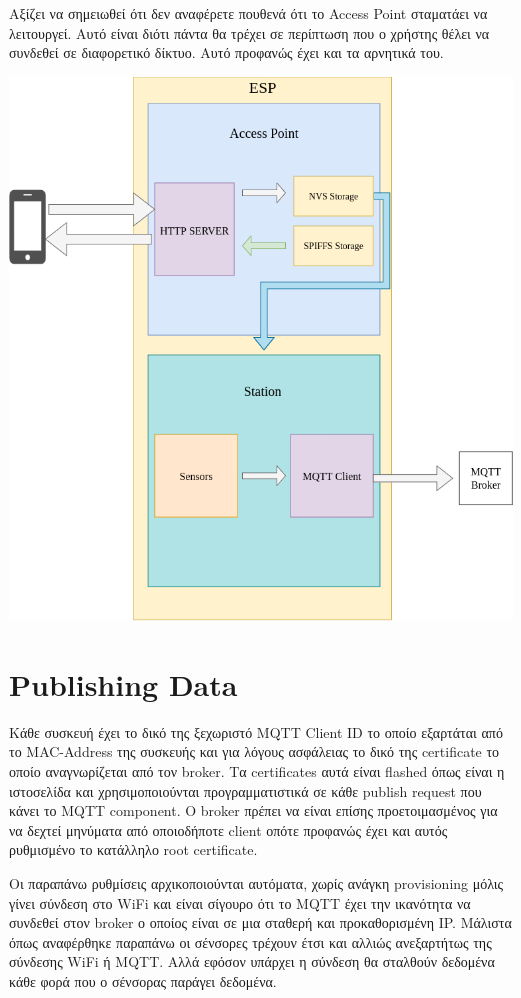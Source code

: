 \documentclass[a4paper,12pt]{article}
\begin{document}
Αξίζει να σημειωθεί ότι δεν αναφέρετε πουθενά ότι το Access Point σταματάει να λειτουργεί. Αυτό είναι διότι πάντα θα τρέχει σε περίπτωση που
ο χρήστης θέλει να συνδεθεί σε διαφορετικό δίκτυο. Αυτό προφανώς έχει και τα αρνητικά του.

\vspace{10mm}

\includegraphics[scale=0.5]{components.png}

\section{Publishing Data}

Κάθε συσκευή έχει το δικό της ξεχωριστό MQTT Client ID το οποίο εξαρτάται από το MAC-Address της συσκευής και για λόγους ασφάλειας
το δικό της certificate το οποίο αναγνωρίζεται από τον broker. Τα certificates αυτά είναι flashed όπως είναι η ιστοσελίδα και χρησιμοποιούνται
προγραμματιστικά σε κάθε publish request που κάνει το MQTT component. Ο broker πρέπει να είναι επίσης προετοιμασμένος
για να δεχτεί μηνύματα από οποιοδήποτε client οπότε προφανώς έχει και αυτός ρυθμισμένο το κατάλληλο root certificate.

Οι παραπάνω ρυθμίσεις αρχικοποιούνται αυτόματα, χωρίς ανάγκη provisioning μόλις γίνει σύνδεση στο WiFi και είναι σίγουρο ότι το MQTT έχει την ικανότητα
να συνδεθεί στον broker ο οποίος είναι σε μια σταθερή και προκαθορισμένη IP. Μάλιστα όπως αναφέρθηκε παραπάνω οι σένσορες τρέχουν έτσι και αλλιώς
ανεξαρτήτως της σύνδεσης WiFi ή MQTT. Αλλά εφόσον υπάρχει η σύνδεση θα σταλθούν δεδομένα κάθε φορά που ο σένσορας παράγει δεδομένα.
\end{document}
